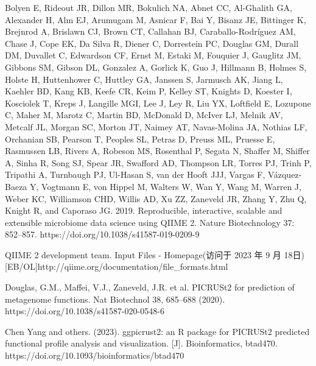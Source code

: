 \documentclass[UTF8]{ctexart}
\begin{document}
\begin{thebibliography}{0}
         Bolyen E, Rideout JR, Dillon MR, Bokulich NA, Abnet CC, Al-Ghalith GA, Alexander H, Alm EJ, Arumugam M, Asnicar F, Bai Y, Bisanz JE, Bittinger K, Brejnrod A, Brislawn CJ, Brown CT, Callahan BJ, Caraballo-Rodríguez AM, Chase J, Cope EK, Da Silva R, Diener C, Dorrestein PC, Douglas GM, Durall DM, Duvallet C, Edwardson CF, Ernst M, Estaki M, Fouquier J, Gauglitz JM, Gibbons SM, Gibson DL, Gonzalez A, Gorlick K, Guo J, Hillmann B, Holmes S, Holste H, Huttenhower C, Huttley GA, Janssen S, Jarmusch AK, Jiang L, Kaehler BD, Kang KB, Keefe CR, Keim P, Kelley ST, Knights D, Koester I, Kosciolek T, Kreps J, Langille MGI, Lee J, Ley R, Liu YX, Loftfield E, Lozupone C, Maher M, Marotz C, Martin BD, McDonald D, McIver LJ, Melnik AV, Metcalf JL, Morgan SC, Morton JT, Naimey AT, Navas-Molina JA, Nothias LF, Orchanian SB, Pearson T, Peoples SL, Petras D, Preuss ML, Pruesse E, Rasmussen LB, Rivers A, Robeson MS, Rosenthal P, Segata N, Shaffer M, Shiffer A, Sinha R, Song SJ, Spear JR, Swafford AD, Thompson LR, Torres PJ, Trinh P, Tripathi A, Turnbaugh PJ, Ul-Hasan S, van der Hooft JJJ, Vargas F, Vázquez-Baeza Y, Vogtmann E, von Hippel M, Walters W, Wan Y, Wang M, Warren J, Weber KC, Williamson CHD, Willis AD, Xu ZZ, Zaneveld JR, Zhang Y, Zhu Q, Knight R, and Caporaso JG. 2019. Reproducible, interactive, scalable and extensible microbiome data science using QIIME 2. Nature Biotechnology 37: 852–857. https://doi.org/10.1038/s41587-019-0209-9

         QIIME 2 development team. Input Files - Homepage(访问于 2023 年 9 月 18日) [EB/OL]http://qiime.org/documentation/file\_formats.html
        
         Douglas, G.M., Maffei, V.J., Zaneveld, J.R. et al. PICRUSt2 for prediction of metagenome functions. Nat Biotechnol 38, 685–688 (2020). https://doi.org/10.1038/s41587-020-0548-6

         Chen Yang and others. (2023). ggpicrust2: an R package for PICRUSt2 predicted functional profile analysis and visualization. [J]. Bioinformatics, btad470. https://doi.org/10.1093/bioinformatics/btad470


    \end{thebibliography}
\end{document}
